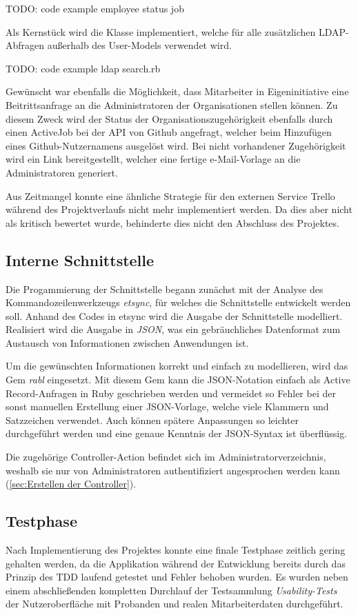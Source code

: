 TODO: code example employee status job

Als Kernstück wird die Klasse  implementiert, welche für alle zusätzlichen
LDAP-Abfragen außerhalb des User-Models verwendet wird.

TODO: code example ldap search.rb

Gewünscht war ebenfalls die Möglichkeit, dass Mitarbeiter \ggfs in Eigeninitiative eine
Beitrittsanfrage an die Administratoren der Organisationen stellen können. Zu diesem Zweck wird der
Status der Organisationszugehörigkeit ebenfalls durch einen ActiveJob bei der API von Github
angefragt, welcher beim Hinzufügen eines Github-Nutzernamens ausgelöst wird.
Bei nicht vorhandener Zugehörigkeit wird ein Link bereitgestellt, welcher eine fertige e-Mail-Vorlage
an die Administratoren generiert.

Aus Zeitmangel konnte eine ähnliche Strategie für den externen Service Trello während des
Projektverlaufs nicht mehr implementiert werden. Da dies aber nicht als kritisch bewertet wurde,
behinderte dies nicht den Abschluss des Projektes.

\subsection{Interne Schnittstelle}
\label{sec:Interne Schnittstelle}
Die Progammierung der Schnittstelle begann zunächst mit der Analyse des Kommandozeilenwerkzeugs
\textit{etsync}, für welches die Schnittstelle entwickelt werden soll. Anhand des Codes in etsync
wird die Ausgabe der Schnittstelle modelliert. Realisiert wird die Ausgabe in \textit{\acs{JSON}},
was ein gebräuchliches Datenformat zum Austausch von Informationen zwischen Anwendungen ist.

Um die gewünschten Informationen korrekt und einfach zu modellieren, wird das Gem \textit{rabl}
eingesetzt. Mit diesem Gem kann die JSON-Notation einfach als Active Record-Anfragen in Ruby
geschrieben werden und vermeidet so Fehler bei der sonst manuellen Erstellung einer JSON-Vorlage,
welche viele Klammern und Satzzeichen verwendet. Auch können spätere Anpassungen so leichter
durchgeführt werden und eine genaue Kenntnis der JSON-Syntax ist überflüssig.

Die zugehörige Controller-Action befindet sich im Administratorverzeichnis, weshalb sie nur von
Administratoren authentifiziert angesprochen werden kann (\Vgl \ref{sec:Erstellen der Controller}).

\subsection{Testphase}
\label{sec:Testphase}
Nach Implementierung des Projektes konnte eine finale Testphase zeitlich gering gehalten werden,
da die Applikation während der Entwicklung bereits durch das Prinzip des \acs{TDD} laufend
getestet und Fehler behoben wurden. Es wurden neben einem abschließenden kompletten Durchlauf der
Testsammlung \textit{Usability-Tests} der Nutzeroberfläche mit Probanden und realen Mitarbeiterdaten
durchgeführt.

